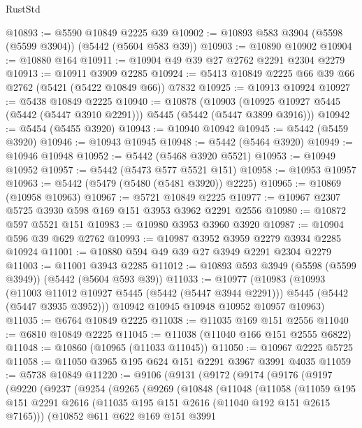 \begin{lexlean}{RustStd}
\begin{coremodule}
{\begin{coremodule}
{{{{{{{{{{{{@10893 := @5590 @10849 @2225 @39
@10902 := @10893 @583 @3904 (@5598 (@5599 @3904)) (@5442 (@5604 @583 @39))
@10903 := @10890 @10902
@10904 := @10880 @164
@10911 := @10904 @49 @39 @27 @2762 @2291 @2304 @2279
@10913 := @10911 @3909 @2285
@10924 := @5413 @10849 @2225 @66 @39 @66 @2762 (@5421 (@5422 @10849 @66)) @7832
@10925 := @10913 @10924
@10927 := @5438 @10849 @2225
@10940 := @10878
    (@10903 (@10925 @10927 @5445 (@5442 (@5447 @3910 @2291))) @5445 (@5442 (@5447 @3899 @3916)))
@10942 := @5454 (@5455 @3920)
@10943 := @10940 @10942
@10945 := @5442 (@5459 @3920)
@10946 := @10943 @10945
@10948 := @5442 (@5464 @3920)
@10949 := @10946 @10948
@10952 := @5442 (@5468 @3920 @5521)
@10953 := @10949 @10952
@10957 := @5442 (@5473 @577 @5521 @151)
@10958 := @10953 @10957
@10963 := @5442 (@5479 (@5480 (@5481 @3920)) @2225)
@10965 := @10869 (@10958 @10963)
@10967 := @5721 @10849 @2225
@10977 := @10967 @2307 @5725 @3930 @598 @169 @151 @3953 @3962 @2291 @2556
@10980 := @10872 @597 @5521 @151
@10983 := @10980 @3953 @3960 @3920
@10987 := @10904 @596 @39 @629 @2762
@10993 := @10987 @3952 @3959 @2279 @3934 @2285 @10924
@11001 := @10880 @594 @49 @39 @27 @3949 @2291 @2304 @2279
@11003 := @11001 @3943 @2285
@11012 := @10893 @593 @3949 (@5598 (@5599 @3949)) (@5442 (@5604 @593 @39))
@11033 := @10977
    (@10983
      (@10993
        (@11003 @11012 @10927 @5445 (@5442 (@5447 @3944 @2291)))
        @5445
        (@5442 (@5447 @3935 @3952)))
      @10942
      @10945
      @10948
      @10952
      @10957
      @10963)
@11035 := @6764 @10849 @2225
@11038 := @11035 @169 @151 @2556
@11040 := @6810 @10849 @2225
@11045 := @11038 (@11040 @166 @151 @2555 @6822)
@11048 := @10860 (@10965 (@11033 @11045))
@11050 := @10967 @2225 @5725
@11058 := @11050 @3965 @195 @624 @151 @2291 @3967 @3991 @4035
@11059 := @5738 @10849
@11220 := @9106
    (@9131
      (@9172
        (@9174
          (@9176
            (@9197
              (@9220
                (@9237
                  (@9254
                    (@9265
                      (@9269
                        (@10848
                          (@11048
                            (@11058
                              (@11059
                                @195
                                @151
                                @2291
                                @2616
                                (@11035 @195 @151 @2616 (@11040 @192 @151 @2615 @7165)))
                              (@10852
                                @611
                                @622
                                @169
                                @151
                                @3991
}}}}}}}}}}}}
\end{coremodule}}
\end{coremodule}
\end{lexlean}
